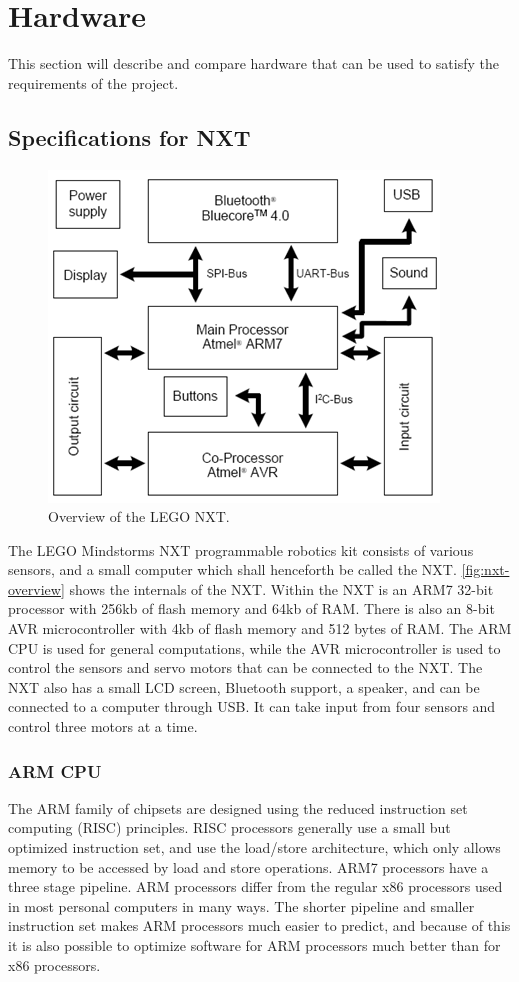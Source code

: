 \section{Hardware}
This section will describe and compare hardware that can be used to satisfy the requirements of the project.

\subsection{Specifications for NXT}

\begin{figure}[hbtp]
\centering
\includegraphics[width=.7\textwidth]{img/lego-nxt-overview.png}
\caption{Overview of the LEGO NXT\cite{nxtspec}.} 
\label{fig:nxt-overview} 
\end{figure}

The LEGO Mindstorms NXT programmable robotics kit consists of various sensors, and a small computer which shall henceforth be called the NXT. \autoref{fig:nxt-overview} shows the internals of the NXT. Within the NXT is an ARM7 32-bit processor with 256kb of flash memory and 64kb of RAM. There is also an 8-bit AVR microcontroller with 4kb of flash memory and 512 bytes of RAM\cite{nxtspec}. The ARM CPU is used for general computations, while the AVR microcontroller is used to control the sensors and servo motors that can be connected to the NXT. The NXT also has a small LCD screen, Bluetooth support, a speaker, and can be connected to a computer through USB. It can take input from four sensors and control three motors at a time.

\subsubsection{ARM CPU}
The ARM family of chipsets are designed using the reduced instruction set computing (RISC) principles\cite{armarchitecture}. RISC processors generally use a small but optimized instruction set, and use the load/store architecture, which only allows memory to be accessed by load and store operations. ARM7 processors have a three stage pipeline. ARM processors differ from the regular x86 processors used in most personal computers in many ways. The shorter pipeline and smaller instruction set makes ARM processors much easier to predict, and because of this it is also possible to optimize software for ARM processors much better than for x86 processors.

